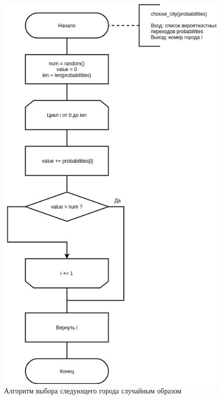 \begin{figure}[H]
	\begin{center}
		\includegraphics[scale=0.7]{img/choose.png}
	\end{center}
	\captionsetup{justification=centering}
	\caption{Алгоритм выбора следующего города случайным образом}
	\label{img:choose}
\end{figure}

